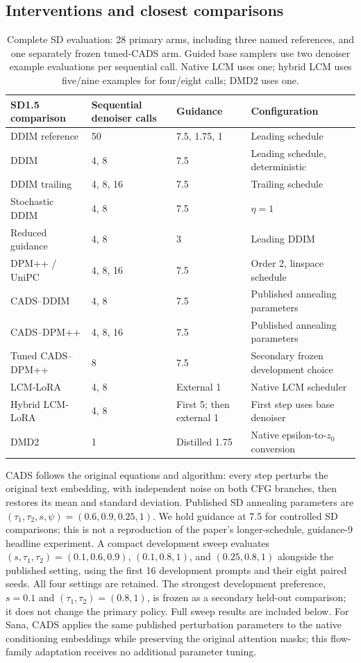 \subsection{Interventions and closest comparisons}
\begin{table}[t]
\centering\small
\begin{tabular}{llll}
\toprule
SD1.5 comparison & Sequential denoiser calls & Guidance & Configuration \\
\midrule
DDIM reference & 50 & 7.5, 1.75, 1 & Leading schedule \\
DDIM & 4, 8 & 7.5 & Leading schedule, deterministic \\
DDIM trailing & 4, 8, 16 & 7.5 & Trailing schedule \\
Stochastic DDIM & 4, 8 & 7.5 & $\eta=1$ \\
Reduced guidance & 4, 8 & 3 & Leading DDIM \\
DPM++ / UniPC & 4, 8, 16 & 7.5 & Order 2, linspace schedule \\
CADS--DDIM & 4, 8 & 7.5 & Published annealing parameters \\
CADS--DPM++ & 4, 8, 16 & 7.5 & Published annealing parameters \\
Tuned CADS--DPM++ & 8 & 7.5 & Secondary frozen development choice \\
LCM-LoRA & 4, 8 & External 1 & Native LCM scheduler \\
Hybrid LCM-LoRA & 4, 8 & First 5; then external 1 & First step uses base denoiser \\
DMD2 & 1 & Distilled 1.75 & Native epsilon-to-$z_0$ conversion \\
\bottomrule
\end{tabular}
\caption{Complete SD evaluation: 28 primary arms, including three named
references, and one separately frozen tuned-CADS arm. Guided base samplers use
two denoiser example evaluations per sequential call. Native LCM uses one;
hybrid LCM uses five/nine examples for four/eight calls; DMD2 uses one.}
\label{tab:t2i_arms}
\end{table}

CADS \cite{sadat2024cads} follows the original equations and algorithm: every
step perturbs the original text embedding, with independent noise on both CFG
branches, then restores its mean and standard deviation. Published SD
annealing parameters are $(\tau_1,\tau_2,s,\psi)=(0.6,0.9,0.25,1)$.
We hold guidance at 7.5 for controlled SD comparisons; this is not a reproduction
of the paper's longer-schedule, guidance-9 headline experiment. A compact
development sweep evaluates $(s,\tau_1,\tau_2)=(0.1,0.6,0.9)$,
$(0.1,0.8,1)$, and $(0.25,0.8,1)$ alongside the published setting, using the
first 16 development prompts and their eight paired seeds. All four settings
are retained. The strongest development preference, $s=0.1$ and
$(\tau_1,\tau_2)=(0.8,1)$, is frozen as a secondary held-out comparison;
it does not change the primary policy. Full sweep results are included below.
For Sana, CADS applies the same published perturbation parameters to the native
conditioning embeddings while preserving the original attention masks; this
flow-family adaptation receives no additional parameter tuning.

